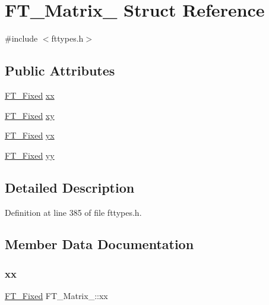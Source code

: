 \hypertarget{struct_f_t___matrix__}{}\section{F\+T\+\_\+\+Matrix\+\_\+ Struct Reference}
\label{struct_f_t___matrix__}


{\ttfamily \#include $<$fttypes.\+h$>$}

\subsection*{Public Attributes}
\begin{DoxyCompactItemize}
\item 
\mbox{\hyperlink{fttypes_8h_a5f5a679cc09f758efdd0d1c5feed3c3d}{F\+T\+\_\+\+Fixed}} \mbox{\hyperlink{struct_f_t___matrix___a27d51c2958634abe7bf377610e095f74}{xx}}
\item 
\mbox{\hyperlink{fttypes_8h_a5f5a679cc09f758efdd0d1c5feed3c3d}{F\+T\+\_\+\+Fixed}} \mbox{\hyperlink{struct_f_t___matrix___a7e9f439d37c00ba1a11919bcaa8937a2}{xy}}
\item 
\mbox{\hyperlink{fttypes_8h_a5f5a679cc09f758efdd0d1c5feed3c3d}{F\+T\+\_\+\+Fixed}} \mbox{\hyperlink{struct_f_t___matrix___a55792583a843a1611b43c40534a02a17}{yx}}
\item 
\mbox{\hyperlink{fttypes_8h_a5f5a679cc09f758efdd0d1c5feed3c3d}{F\+T\+\_\+\+Fixed}} \mbox{\hyperlink{struct_f_t___matrix___a689a6fd20a88238788b90c3597ee0c2a}{yy}}
\end{DoxyCompactItemize}


\subsection{Detailed Description}


Definition at line 385 of file fttypes.\+h.



\subsection{Member Data Documentation}
\mbox{\label{struct_f_t___matrix___a27d51c2958634abe7bf377610e095f74}} 
\subsubsection{\texorpdfstring{xx}{xx}}
{\footnotesize\ttfamily \mbox{\hyperlink{fttypes_8h_a5f5a679cc09f758efdd0d1c5feed3c3d}{F\+T\+\_\+\+Fixed}} F\+T\+\_\+\+Matrix\+\_\+\+::xx}



